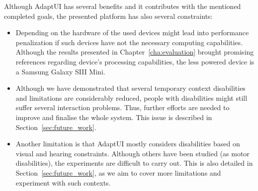 Although AdaptUI has several benefits and it contributes with the mentioned 
completed goals, the presented platform has also several constraints:

\begin{itemize}
  \item Depending on the hardware of the used devices might lead into 
  performance penalization if such devices have not the necessary computing
  capabilities. Although the results presented in 
  Chapter~\ref{cha:evaluation} brought promising references regarding device's 
  processing capabilities, the less powered device is a Samsung Galaxy SIII Mini.
  
  \item Although we have demonstrated that several temporary context 
  disabilities and limitations are considerably reduced, people with 
  disabilities might still suffer several interaction problems. Thus, further 
  efforts are needed to improve and finalise the whole system. This issue is 
  described in Section~\ref{sec:future_work}.
  
  \item Another limitation is that AdaptUI mostly considers disabilities based
  on visual and hearing constraints. Although others have been studied (as motor
  disabilities), the experiments are difficult to carry out. This is also 
  detailed in Section~\ref{sec:future_work}, as we aim to cover more limitations 
  and experiment with such contexts.
\end{itemize}